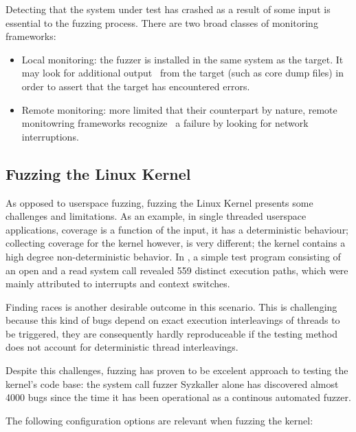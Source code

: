 Detecting that the system under test has crashed as a result of some input is essential to the fuzzing process.
There are two broad classes of monitoring frameworks\cite{mcnallyFuzzingStateArt2012}:

\begin{itemize}
    \item Local monitoring: the fuzzer is installed in the same system as the target. It may look for additional output \
    from the target (such as core dump files) in order to assert that the target has encountered errors.
    \item Remote monitoring: more limited that their counterpart by nature, remote monitowring frameworks recognize \
    a failure by looking for network interruptions.
\end{itemize}

\subsection{Fuzzing the Linux Kernel}\label{ss:fuzzingkernel}

As opposed to userspace fuzzing, fuzzing the Linux Kernel
presents some challenges and limitations. As an example, in single threaded
userspace applications, coverage is a function of the input, it has a
deterministic behaviour; collecting coverage for the kernel however, is
very different;  the kernel contains a high degree
non-deterministic behavior. In \cite{okechInvestigatingExecutionPath2013}, a
simple test program consisting of an open and a read system call revealed
559 distinct execution paths, which were mainly attributed to interrupts and context switches.

Finding races is another desirable outcome in this scenario. This is
challenging because this kind of bugs depend on exact
execution interleavings of threads to be triggered, they are consequently hardly reproduceable if the testing method does not account for deterministic
thread interleavings.

Despite this challenges, fuzzing has proven to be excelent approach to testing the
kernel's code base: the system call fuzzer Syzkaller alone has discovered
almost  4000 bugs since the time it has been operational as a continous
automated fuzzer\cite{Syzbot}.

The following configuration options are relevant when fuzzing the kernel:

